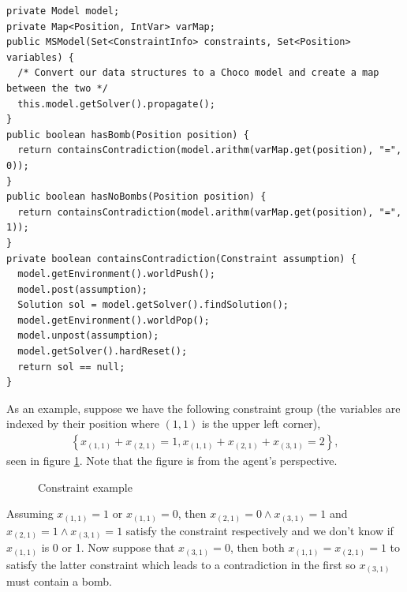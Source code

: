 \documentclass[11pt,a4paper,notitlepage]{article}
\newcommand{\set}[1]{\left\{#1\right\}} %
\theoremstyle{definition}
\begin{document}
\begin{lstlisting}[caption={Searching with Choco}, label={lst:choco}]
private Model model;
private Map<Position, IntVar> varMap;
public MSModel(Set<ConstraintInfo> constraints, Set<Position> variables) {
  /* Convert our data structures to a Choco model and create a map between the two */
  this.model.getSolver().propagate();
}
public boolean hasBomb(Position position) {
  return containsContradiction(model.arithm(varMap.get(position), "=", 0));
}
public boolean hasNoBombs(Position position) {
  return containsContradiction(model.arithm(varMap.get(position), "=", 1));
}
private boolean containsContradiction(Constraint assumption) {
  model.getEnvironment().worldPush();
  model.post(assumption);
  Solution sol = model.getSolver().findSolution();
  model.getEnvironment().worldPop(); 
  model.unpost(assumption);
  model.getSolver().hardReset();
  return sol == null;
}
\end{lstlisting}

As an example, suppose we have the following constraint group (the variables are indexed by their position where $(1,1)$ is the upper left corner),
\begin{align*}
\set{x_{(1,1)} + x_{(2,1)} = 1, x_{(1,1)}+x_{(2,1)}+x_{(3,1)} = 2},
\end{align*}
seen in figure \ref{fig:csp}. Note that the figure is from the agent's perspective.
\begin{figure}[H]
\begin{center}
\end{center}
\caption{Constraint example}
\label{fig:csp}
\end{figure}
Assuming $x_{(1,1)} = 1$ or $x_{(1,1)} = 0$, then $x_{(2,1)} = 0 \wedge x_{(3,1)}=1$ and $x_{(2,1)}=1 \wedge x_{(3,1)}=1$ satisfy the constraint respectively and we don't know if $x_{(1,1)}$ is 0 or 1. Now suppose that $x_{(3,1)} = 0$, then both $x_{(1,1)} = x_{(2,1)} = 1$ to satisfy the latter constraint which leads to a contradiction in the first so $x_{(3,1)}$ must contain a bomb.
\end{document}
